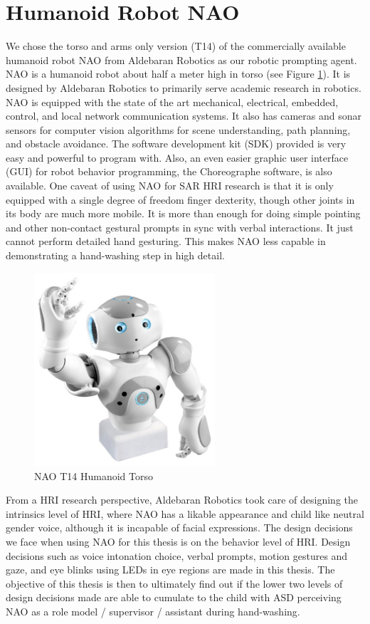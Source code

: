 \section{Humanoid Robot NAO}

We chose the torso and arms only version (T14) of the commercially available humanoid robot NAO from Aldebaran Robotics as our robotic prompting agent.  NAO is a humanoid robot about half a meter high in torso (see Figure \ref{fig:NAOColor}).  It is designed by Aldebaran Robotics to primarily serve academic research in robotics.  NAO is equipped with the state of the art mechanical, electrical, embedded, control, and local network communication systems.  It also has cameras and sonar sensors for computer vision algorithms for scene understanding, path planning, and obstacle avoidance.  The software development kit (SDK) provided is very easy and powerful to program with.  Also, an even easier graphic user interface (GUI) for robot behavior programming, the Choreographe software, is also available.  One caveat of using NAO for SAR HRI research is that it is only equipped with a single degree of freedom finger dexterity, though other joints in its body are much more mobile.  It is more than enough for doing simple pointing and other non-contact gestural prompts in sync with verbal interactions.  It just cannot perform detailed hand gesturing.  This makes NAO less capable in demonstrating a hand-washing step in high detail.
\begin{figure} [h]
	\centering
	\includegraphics[width=0.6\textwidth]{./img/nao-torso.jpg}
	\caption{NAO T14 Humanoid Torso}
	\label{fig:NAOColor}
\end{figure}


From a HRI research perspective, Aldebaran Robotics took care of designing the intrinsics level of HRI, where NAO has a likable appearance and child like neutral gender voice, although it is incapable of facial expressions.  The design decisions we face when using NAO for this thesis is on the behavior level of HRI.  Design decisions such as voice intonation choice, verbal prompts, motion gestures and gaze, and eye blinks using LEDs in eye regions are made in this thesis.  The objective of this thesis is then to ultimately find out if the lower two levels of design decisions made are able to cumulate to the child with ASD perceiving NAO as a role model / supervisor / assistant during hand-washing.

